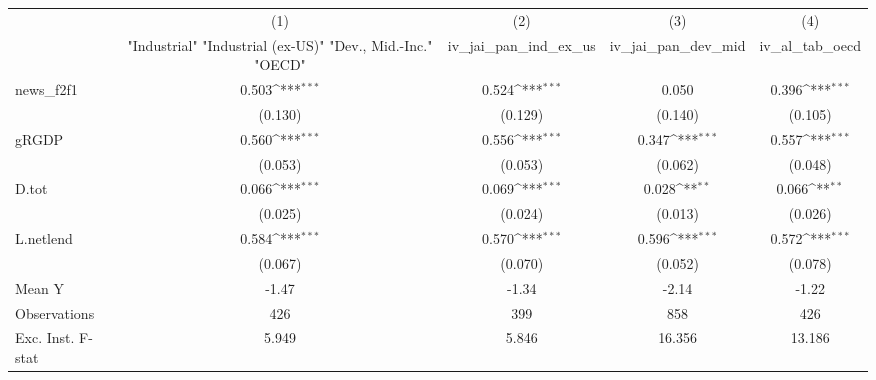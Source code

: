 {
\def\sym#1{\ifmmode^{#1}\else\(^{#1}\)\fi}
\begin{tabular}{l*{4}{c}}
\toprule
            &\multicolumn{1}{c}{(1)}&\multicolumn{1}{c}{(2)}&\multicolumn{1}{c}{(3)}&\multicolumn{1}{c}{(4)}\\
            &\multicolumn{1}{c}{ "Industrial" "Industrial (ex-US)" "Dev., Mid.-Inc." "OECD" }&\multicolumn{1}{c}{iv\_jai\_pan\_ind\_ex\_us}&\multicolumn{1}{c}{iv\_jai\_pan\_dev\_mid}&\multicolumn{1}{c}{iv\_al\_tab\_oecd}\\
\midrule
news\_f2f1   &       0.503\sym{***}&       0.524\sym{***}&       0.050         &       0.396\sym{***}\\
            &     (0.130)         &     (0.129)         &     (0.140)         &     (0.105)         \\
\addlinespace
gRGDP       &       0.560\sym{***}&       0.556\sym{***}&       0.347\sym{***}&       0.557\sym{***}\\
            &     (0.053)         &     (0.053)         &     (0.062)         &     (0.048)         \\
\addlinespace
D.tot       &       0.066\sym{***}&       0.069\sym{***}&       0.028\sym{**} &       0.066\sym{**} \\
            &     (0.025)         &     (0.024)         &     (0.013)         &     (0.026)         \\
\addlinespace
L.netlend   &       0.584\sym{***}&       0.570\sym{***}&       0.596\sym{***}&       0.572\sym{***}\\
            &     (0.067)         &     (0.070)         &     (0.052)         &     (0.078)         \\
\midrule
Mean Y      &       -1.47         &       -1.34         &       -2.14         &       -1.22         \\
Observations&         426         &         399         &         858         &         426         \\
Exc. Inst. F-stat&       5.949         &       5.846         &      16.356         &      13.186         \\
\bottomrule
\end{tabular}
}
